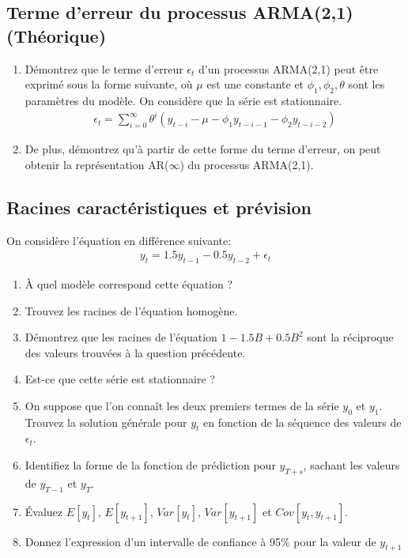 \documentclass[11pt,english,francais]{article}
\begin{document}
\subsection{Terme d'erreur du processus ARMA(2,1) (Théorique)}

\begin{enumerate}
\item Démontrez que le terme d'erreur $\epsilon_t$ d'un processus ARMA(2,1) peut être exprimé sous la forme suivante, où $\mu$ est une constante et $\phi_1, \phi_2, \theta$ sont les paramètres du modèle. On considère que la série est stationnaire.
\begin{align*}
  \epsilon_t = \sum_{i=0}^{\infty} \theta^i \left(y_{t-i} - \mu - \phi_1 y_{t-i-1} - \phi_2 y_{t-i-2} \right)
\end{align*}

\item De plus, démontrez qu'à partir de cette forme du terme d'erreur, on peut obtenir la représentation AR($\infty$) du processus ARMA(2,1).
\end{enumerate}

\subsection{Racines caractéristiques et prévision}

On considère l'équation en différence suivante:
\begin{align*}
  y_t = 1.5 y_{t-1} - 0.5 y_{t-2} + \epsilon_t
\end{align*}
\begin{enumerate}
\item À quel modèle correspond cette équation ?
\item Trouvez les racines de l'équation homogène.
\item Démontrez que les racines de l'équation $1-1.5B+0.5B^2$ sont la réciproque des valeurs trouvées à la question précédente.
\item Est-ce que cette série est stationnaire ?
\item On suppose que l'on connaît les deux premiers termes de la série $y_0$ et $y_1$. Trouvez la solution générale pour $y_t$ en fonction de la séquence des valeurs de $\epsilon_t$.
\item Identifiez la forme de la fonction de prédiction pour $y_{T+s}$, sachant les valeurs de $y_{T-1}$ et $y_T$.
\item Évaluez $E[y_t]$, $E[y_{t+1}]$, $Var[y_t]$, $Var[y_{t+1}]$ et $Cov[y_{t},y_{t+1}]$.
\item Donnez l'expression d'un intervalle de confiance à 95\% pour la valeur de $y_{t+1}$ 
\end{enumerate}
\end{document}
